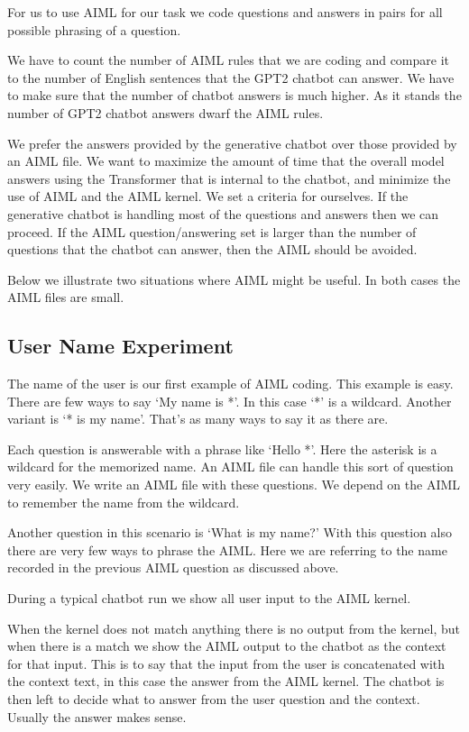 For us to use AIML for our task we code questions and answers in pairs for all possible phrasing of a question.

We have to count the number of AIML rules that we are coding and compare it to the number of English sentences that the GPT2 chatbot can answer. We have to make sure that the number of chatbot answers is much higher. As it stands the number of GPT2 chatbot answers dwarf the AIML rules.

We prefer the answers provided by the generative chatbot over those provided by an AIML file. We want to maximize the amount of time that the overall model answers using the Transformer that is internal to the chatbot, and minimize the use of AIML and the AIML kernel. We set a criteria for ourselves. If the generative chatbot is handling most of the questions and answers then we can proceed. If the AIML question/answering set is larger than the number of questions that the chatbot can answer, then the AIML should be avoided. 

Below we illustrate two situations where AIML might be useful. In both cases the AIML files are small.

\subsection{User Name Experiment}
The name of the user is our first example of AIML coding. This example is easy. There are few ways to say `My name is *'. In this case `*' is a wildcard. Another variant is `* is my name'. That's as many ways to say it as there are.

Each question is answerable with a phrase like `Hello *'. Here the asterisk is a wildcard for the memorized name. An AIML file can handle this sort of question very easily. We write an AIML file with these questions. We depend on the AIML to remember the name from the wildcard. 

Another question in this scenario is `What is my name?' With this question also there are very few ways to phrase the AIML. Here we are referring to the name recorded in the previous AIML question as discussed above. 

During a typical chatbot run we show all user input to the AIML kernel. 

When the kernel does not match anything there is no output from the kernel, but when there is a match we show the AIML output to the chatbot as the context for that input. This is to say that the input from the user is concatenated with the context text, in this case the answer from the AIML kernel. The chatbot is then left to decide what to answer from the user question and the context. Usually the answer makes sense.

